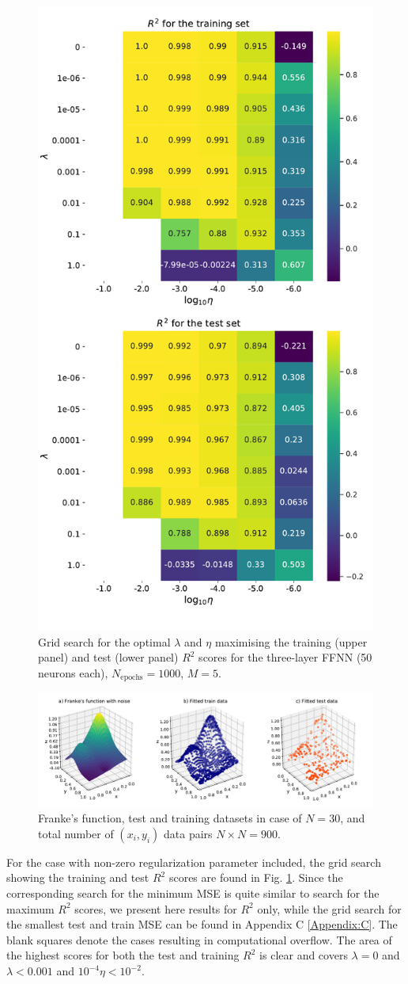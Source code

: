 \documentclass{emulateapj}
\begin{document}
\begin{figure}[!htb]
    \centering
    \includegraphics[width=.49\textwidth]{Figures/NN_ridge_R2.pdf}
    \caption{Grid search for the optimal $\lambda$ and $\eta$ maximising the training (upper panel) and test (lower panel) $R^2$ scores for the three-layer FFNN (50 neurons each), $N_{\mathrm{epochs}}=1000$, $M=5$.}
    \label{fig: NN_ridge_R2}
\end{figure}

\begin{figure}
\includegraphics[width=1.0\textwidth]{Figures/Franke.pdf}
\caption{\label{fig:Franke_fig}Franke's function, test and training datasets in case of $N=30$, and total number of $(x_i,y_i)$ data pairs $N\times N=900$.}
\end{figure}

For the case with non-zero regularization parameter included, the grid search showing the training and test $R^{2}$ scores are found in Fig. \ref{fig: NN_ridge_R2}. Since the corresponding search for the minimum MSE is quite similar to search for the maximum $R^{2}$ scores, we present here results for $R^{2}$ only, while the grid search for the smallest test and train MSE can be found in Appendix C \ref{Appendix:C}. The blank squares denote the cases resulting in computational overflow. The area of the highest scores for both the test and training $R^{2}$ is clear and covers $\lambda=0$ and $\lambda<0.001$ and $10^{-4}\eta<10^{-2}$.
\end{document}

